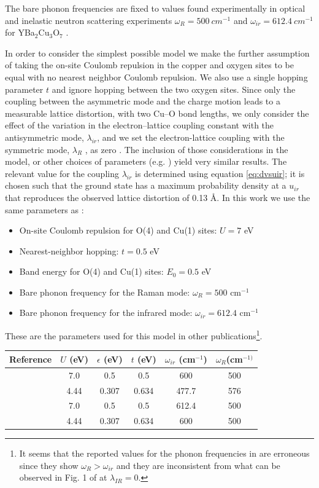 The bare phonon frequencies are fixed to values found experimentally in optical and inelastic neutron scattering experiments $\omega_R = 500\ cm^{-1}$ and $\omega_{ir} = 612.4\ cm^{-1}$ for YBa$_2$Cu$_3$O$_7$ \cite{?}.

In order to consider the simplest possible model we make the further assumption of taking the on-site Coulomb repulsion in the copper and oxygen sites to be equal with no nearest neighbor Coulomb repulsion. 
We also use a single hopping parameter $t$ and ignore hopping between the two oxygen sites. 
Since only the coupling between the asymmetric mode and the charge motion leads to a measurable lattice distortion, with two Cu–O bond lengths, we only consider the effect of the variation in the electron–lattice coupling constant with the antisymmetric mode, $\lambda_{ir}$, and we set the electron-lattice coupling with the symmetric mode, $\lambda_R$ , as zero \cite{Salkola1995}. 
The inclusion of those considerations in the model, or other choices of parameters (e.g. \cite{Salkola1994, Salkola1995}) yield very similar results.
The relevant value for the coupling $\lambda_{ir}$ is determined using equation \ref{eq:dvsuir}; it is chosen such that the ground state has a maximum probability density at a $u_{ir}$ that reproduces the observed lattice distortion of 0.13 \AA \cite{?}.
In this work we use the same parameters as \cite{Mena2006, DeLeon1999, Leon2008, MirandaMena2007}:

\begin{itemize}
\item On-site Coulomb repulsion for O(4) and Cu(1) sites: $U=7$ eV
\item Nearest-neighbor hopping: $t=0.5$ eV
\item Band energy for O(4) and Cu(1) sites: $E_0=0.5$ eV
\item Bare phonon frequency for the Raman mode: $\omega_R=500$ cm$^{-1}$
\item Bare phonon frequency for the infrared mode: $\omega_{ir}=612.4$ cm$^{-1}$
\end{itemize}

These are the parameters used for this model in other publications\footnote{It seems that the reported values for the phonon frequencies in \cite{Salkola1994, Salkola1995} are erroneous since they show $\omega_R > \omega_{ir}$ and they are inconsistent from what can be observed in Fig. 1 of \cite{Salkola1994} at $\lambda_{IR}=0$.}.

\noindent\begin{tabular}{| l | c | c | c | c | c |}
\hline
Reference & $U$ (eV) & $\epsilon$ (eV) & $t$ (eV) & $\omega_{ir}$ (cm$^{-1}$) & $\omega_R$(cm$^{-1)}$ \\
\hline
\cite{MustredeLeon1992} & 7.0 & 0.5 & 0.5 & 600 & 500 \\ 
\cite{Salkola1994, Salkola1995} & 4.44 & 0.307 & 0.634 & 477.7 & 576  \\
\cite{Mena2006,DeLeon1999, Leon2008, MirandaMena2007} & 7.0 & 0.5 & 0.5 & 612.4 & 500 \\ 
\cite{MustredeLeon2000} & 4.44 & 0.307 & 0.634 & 600 & 500 \\
\hline
\end{tabular}

